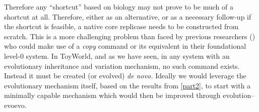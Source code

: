 Therefore any ``shortcut'' based on biology may not prove to be much of a shortcut at all. Therefore, either as an alternative, or as a necessary follow-up if the shortcut is feasible, a native core replicase needs to be constructed from scratch. This is a more challenging problem than faced by previous researchers (\eg \parencite{Hickinbotham2011, Nellis2012, Ray1991, Ofria2004, Fontana1992}) who could make use of a \emph{copy} command or its equivalent in their foundational level-0 system. In ToyWorld, and as we have seen, in any system with an evolutionary inheritance and variation mechanism, no such command exists. Instead it must be created (or evolved) \emph{de novo.} Ideally we would leverage the evolutionary mechanism itself, based on the results from \cref{part2}, to start with a minimally capable mechanism which would then be improved through evolution--evoevo.